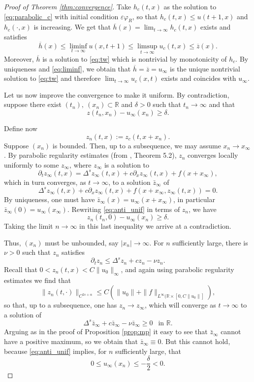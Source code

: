 \documentclass[11pt,a4paper]{amsart}
\newcommand{\R}{\mathbb{R}}
\newcommand{\inSet}[1]{\text{ in } {#1}}
\renewcommand{\phi}{\varphi}
\renewcommand{\epsilon}{\varepsilon}
\begin{document}
\begin{proof}[Proof of Theorem \ref{thm:convergence}]
Take $h_c(t,x)$ as the solution to \eqref{eq:parabolic_c} with initial condition $\epsilon \phi_R$, so that $h_c(t,x) \leq u(t+1,x)$ and $h_c(\cdot,x)$ is increasing. We get that $\overline{h}(x) = \lim_{t\rightarrow \infty} h_c(t,x)$ exists and satisfies
\begin{equation}
\label{eq:liminf}
\overline{h}(x) \leq \liminf_{t\rightarrow \infty} u(x,t+1) \leq \limsup_{t\rightarrow \infty} u_c(t,x) \leq \overline{z}(x).
\end{equation}
Moreover, $\overline{h}$ is a solution to \eqref{eq:tw} which is nontrivial by monotonicity of $h_c$. By uniqueness and \eqref{eq:liminf}, we obtain that $\overline{h} = \overline{z} = u_{\infty}$ is the unique nontrivial solution to \eqref{eq:tw} and therefore $\lim_{t\rightarrow \infty} u_c(x,t)$ exists and coincides with $u_{\infty}$.

Let us now improve the convergence to make it uniform. By contradiction, suppose there exist $(t_n), ~(x_n)\subset \R$ and $\delta >0$ such that $t_n \rightarrow \infty$ and that 
\begin{equation}
\label{eq:anti_unif}
z(t_n,x_n) - u_{\infty}(x_n) \geq \delta.
\end{equation}

Define now 
\[z_n(t,x) := z_c(t,x + x_n).\]
Suppose $(x_n)$ is bounded. Then, up to a subsequence, we may assume $x_n\rightarrow x_{\infty}$. By parabolic regularity estimates (from \cite{CLD12}, Theorem 5.2), $z_n$ converges locally uniformly to some $z_{\infty}$, where $z_{\infty}$ is a solution to 
\[\partial_t  z_{\infty}(t,x) = \Delta^s z_{\infty} (t,x) +c\partial_x z_{\infty}(t,x) + f(x + x_{\infty}),\]
which in turn converges, as $t\rightarrow \infty$, to a solution $\bar{z}_{\infty}$ of 
\[\Delta^s z_{\infty} (t,x) +c\partial_x z_{\infty}(t,x) + f(x + x_{\infty}, z_{\infty}(t,x)) = 0.\]
By uniqueness, one must have $\bar{z}_{\infty}(x) = u_{\infty}(x + x_{\infty})$, in particular $\bar{z}_{\infty}(0) = u_{\infty}(x_{\infty})$. Rewriting \eqref{eq:anti_unif} in terms of $z_n$, we have 
\[z_n(t_n, 0) - u_{\infty}(x_n) \geq \delta.\]
Taking the limit $n\rightarrow \infty$ in this last inequality we arrive at a contradiction.

Thus, $(x_n)$ must be unbounded, say $|x_n| \rightarrow \infty$. For $n$ sufficiently large, there is $\nu > 0$ such that $z_n$ satisfies
\[\partial_t z_n \leq \Delta^s z_n + c z_n - \nu z_n.\]
Recall that $0 < z_n(t,x) <C\|u_0\|_{\infty}$, and again using parabolic regularity estimates we find that 
\[\|z_n(t,\cdot)\|_{C^{2s+\alpha}} \leq C(\|u_0\| + \|f\|_{L^{\infty}(\R\times [0, C\|u_0\|]}),\] 
so that, up to a subsequence, one has $z_n\rightarrow z_{\infty}$, which will converge as $t\rightarrow \infty$ to a solution of 
\[\Delta^s  \bar{z}_{\infty} + c\bar{z}_{\infty} - \nu \bar{z}_{\infty} \geq 0 ~~ \inSet{\R}.\]
Arguing as in the proof of Proposition \ref{prop:mp} it easy to see that $\bar{z}_{\infty}$ cannot have a positive maximum, so we obtain that $\bar{z}_{\infty} \equiv 0$. But this cannot hold, because \eqref{eq:anti_unif} implies, for $n$ sufficiently large, that
\[0\leq u_{\infty}(x_n) \leq -\frac{\delta}{2} < 0.\]


\end{proof}
\end{document}
